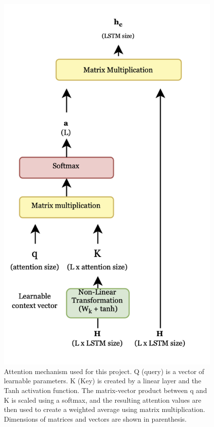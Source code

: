 \begin{figure}
    \centering
    \includegraphics[scale=0.38]{figures/attention_diagram.png}
    \caption{Attention mechanism used for this project. Q (query) is a vector of learnable parameters. K (Key) is created by a linear layer and the Tanh activation function. The matrix-vector product between q and K is scaled using a softmax, and the resulting attention values are then used to create a weighted average using matrix multiplication. Dimensions of matrices and vectors are shown in parenthesis.}
    \label{fig:attention_schema}
\end{figure}

